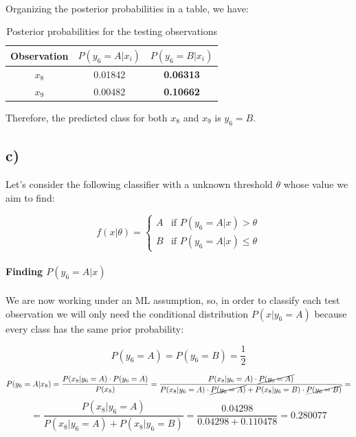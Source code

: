 \documentclass{article}
\begin{document}
\paragraph{}

Organizing the posterior probabilities in a table, we have:

\begin{table}[H]
\centering
\begin{tabular}{|c|c|c|}
\hline
Observation & $P(y_6=A|x_i)$ & $P(y_6=B|x_i)$ \\ \hline
$x_8$       & 0.01842         & \textbf{0.06313}        \\ \hline
$x_9$       & 0.00482         & \textbf{0.10662}        \\ \hline
\end{tabular}
\label{tab:posterior_probabilities}
\caption{Posterior probabilities for the testing observations}
\end{table}

Therefore, the predicted class for both $x_8$ and $x_9$ is $y_6=B$.

\subsection*{c)}

Let's consider the following classifier with a unknown threshold $\theta$ whose value we aim to find:

\[
  f(x|\theta) = \begin{cases}
    A & \text{if } P(y_6=A|x) > \theta \\
    B & \text{if } P(y_6=A|x) \leq \theta
  \end{cases}
\]

\paragraph{Finding $P(y_6=A|x)$}
\paragraph{}

We are now working under an ML assumption, so, in order to classify each test observation we will only need the conditional distribution $P(x|y_6=A)$ because every class has the same prior probability:

\[ P(y_6 = A) = P(y_6 = B) = \frac{1}{2} \]

\[ P(y_6 = A|x_8) = \frac{P(x_8 | y_6 = A) \cdot P(y_6 = A)}{P(x_8)} = \frac{P(x_8 | y_6 = A) \cdot \cancel{P(y_6 = A)}}{P(x_8 | y_6 = A)\cdot \cancel{P(y_6 = A)} + P(x_8 | y_6 = B)\cdot \cancel{P(y_6 = B)}} = \]
\[ = \frac{P(x_8 | y_6 = A)}{P(x_8 | y_6 = A) + P(x_8 | y_6 = B)} = \frac{0.04298}{0.04298 + 0.110478} = 0.280077 \]
\end{document}
